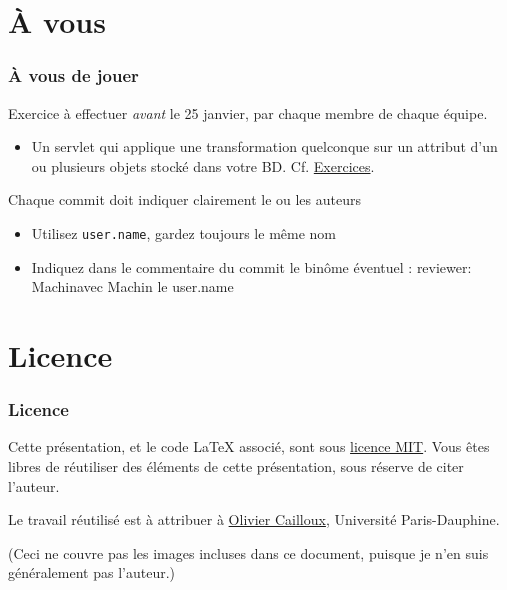 \documentclass[english, french]{beamer}
\begin{document}
\section{À vous}
\begin{frame}
	\frametitle{À vous de jouer}
	Exercice à effectuer \emph{avant} le 25 janvier, par chaque membre de chaque équipe.
	\begin{itemize}
		\item[+\footnote{Le + indique que cet aspect intervient dans la note}] Un servlet qui applique une transformation quelconque sur un attribut d’un ou plusieurs objets stocké dans votre BD. Cf. \hyperlink{Exercices}{Exercices}.
	\end{itemize}
	Chaque commit doit indiquer clairement le ou les auteurs
	\begin{itemize}
		\item Utilisez \texttt{user.name}, \alert{gardez toujours le même nom}
		\item Indiquez dans le commentaire du commit le binôme éventuel : \og\alert{reviewer: Machin}\fg avec Machin le user.name
	\end{itemize}
\end{frame}

\appendix
\AtBeginSection{
}
\section{Licence}
\begin{frame}
	\frametitle{Licence}
	Cette présentation, et le code LaTeX associé, sont sous \href{http://opensource.org/licenses/MIT}{licence MIT}. Vous êtes libres de réutiliser des éléments de cette présentation, sous réserve de citer l’auteur.
	
	Le travail réutilisé est à attribuer à \href{http://www.lamsade.dauphine.fr/~ocailloux/}{Olivier Cailloux}, Université Paris-Dauphine.
	
	\small{(Ceci ne couvre pas les images incluses dans ce document, puisque je n’en suis généralement pas l’auteur.)}
\end{frame}
\end{document}
